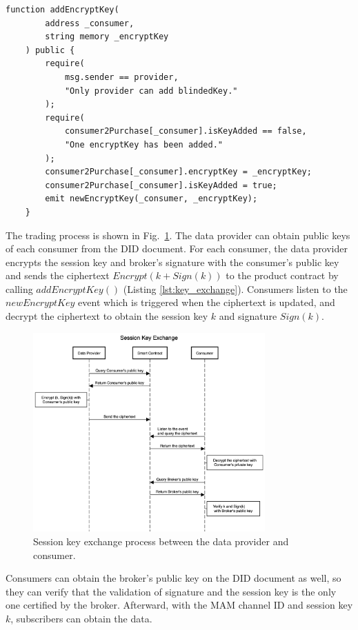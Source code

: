 \documentclass[conference]{IEEEtran}
\begin{document}
\lstset{style=solidity}

\begin{lstlisting}[caption={Update encrypt key}, label={lst:key_exchange}, frame=single]
    function addEncryptKey(
        address _consumer,
        string memory _encryptKey
    ) public {
        require(
            msg.sender == provider,
            "Only provider can add blindedKey."
        );
        require(
            consumer2Purchase[_consumer].isKeyAdded == false,
            "One encryptKey has been added."
        );
        consumer2Purchase[_consumer].encryptKey = _encryptKey;
        consumer2Purchase[_consumer].isKeyAdded = true;
        emit newEncryptKey(_consumer, _encryptKey);
    }
\end{lstlisting}

The trading process is shown in Fig.~\ref{fig:key_exchange}. The data provider can obtain public keys of each consumer from the DID document. For each consumer, the data provider encrypts the session key and broker's signature with the consumer's public key and sends the ciphertext $Encrypt(k + Sign(k))$ to the product contract by calling $addEncryptKey()$ (Listing \ref{lst:key_exchange}). Consumers listen to the $newEncryptKey$ event which is triggered when the ciphertext is updated, and decrypt the ciphertext to obtain the session key $k$ and signature $Sign(k)$.

\begin{figure}[!t]
    \centering
    \includegraphics[width=3.5in]{key_exchange}
    \caption{Session key exchange process between the data provider and consumer.}
    \label{fig:key_exchange}
\end{figure}

Consumers can obtain the broker's public key on the DID document as well, so they can verify that the validation of signature and the session key is the only one certified by the broker. Afterward, with the MAM channel ID and session key $k$, subscribers can obtain the data.
\end{document}

